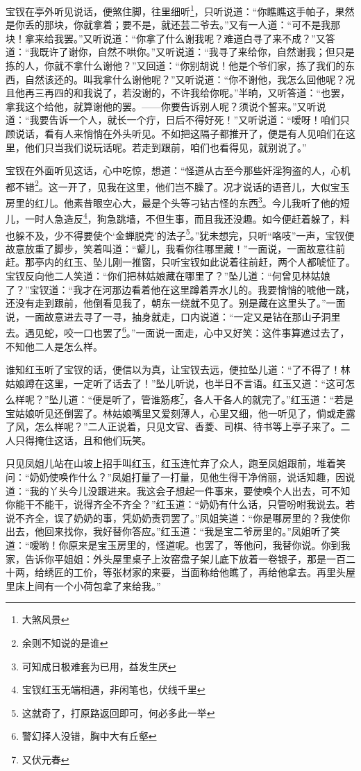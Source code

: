 \documentclass[12pt,oneside]{book}
\begin{document}
宝钗在亭外听见说话，便煞住脚，往里细听\footnote{大煞风景}，只听说道：“你瞧瞧这手帕子，果然是你丢的那块，你就拿着；要不是，就还芸二爷去。”又有一人道：“可不是我那块！拿来给我罢。”又听说道：“你拿了什么谢我呢？难道白寻了来不成？”又答道：“我既许了谢你，自然不哄你。”又听说道：“我寻了来给你，自然谢我；但只是拣的人，你就不拿什么谢他？”又回道：“你别胡说！他是个爷们家，拣了我们的东西，自然该还的。叫我拿什么谢他呢？”又听说道：“你不谢他，我怎么回他呢？况且他再三再四的和我说了，若没谢的，不许我给你呢。”半晌，又听答道：“也罢，拿我这个给他，就算谢他的罢。——你要告诉别人呢？须说个誓来。”又听说道：“我要告诉一个人，就长一个疔，日后不得好死！”又听说道：“嗳呀！咱们只顾说话，看有人来悄悄在外头听见。不如把这隔子都推开了，便是有人见咱们在这里，他们只当我们说玩话呢。若走到跟前，咱们也看得见，就别说了。”

宝钗在外面听见这话，心中吃惊，想道：“怪道从古至今那些奸淫狗盗的人，心机都不错\footnote{余则不知说的是谁}。这一开了，见我在这里，他们岂不臊了。况才说话的语音儿，大似宝玉房里的红儿。他素昔眼空心大，最是个头等刁钻古怪的东西\footnote{可知成日极难套为已用，益发生厌}。今儿我听了他的短儿，一时人急造反\footnote{宝钗红玉无端相遇，非闲笔也，伏线千里}，狗急跳墙，不但生事，而且我还没趣。如今便赶着躲了，料也躲不及，少不得要使个‘金蝉脱壳’的法子\footnote{这就奇了，打原路返回即可，何必多此一举}。”犹未想完，只听“咯吱”一声，宝钗便故意放重了脚步，笑着叫道：“颦儿，我看你往哪里藏！”一面说，一面故意往前赶。那亭内的红玉、坠儿刚一推窗，只听宝钗如此说着往前赶，两个人都唬怔了。宝钗反向他二人笑道：“你们把林姑娘藏在哪里了？”坠儿道：“何曾见林姑娘了？”宝钗道：“我才在河那边看着他在这里蹲着弄水儿的。我要悄悄的唬他一跳，还没有走到跟前，他倒看见我了，朝东一绕就不见了。别是藏在这里头了。”一面说，一面故意进去寻了一寻，抽身就走，口内说道：“一定又是钻在那山子洞里去。遇见蛇，咬一口也罢了\footnote{警幻择人没错，胸中大有丘壑}。”一面说一面走，心中又好笑：这件事算遮过去了，不知他二人是怎么样。

谁知红玉听了宝钗的话，便信以为真，让宝钗去远，便拉坠儿道：“了不得了！林姑娘蹲在这里，一定听了话去了！”坠儿听说，也半日不言语。红玉又道：“这可怎么样呢？”坠儿道：“便是听了，管谁筋疼\footnote{又伏元春}，各人干各人的就完了。”红玉道：“若是宝姑娘听见还倒罢了。林姑娘嘴里又爱刻薄人，心里又细，他一听见了，倘或走露了风，怎么样呢？”二人正说着，只见文官、香菱、司棋、待书等上亭子来了。二人只得掩住这话，且和他们玩笑。

只见凤姐儿站在山坡上招手叫红玉，红玉连忙弃了众人，跑至凤姐跟前，堆着笑问：“奶奶使唤作什么？”凤姐打量了一打量，见他生得干净俏丽，说话知趣，因说道：“我的丫头今儿没跟进来。我这会子想起一件事来，要使唤个人出去，可不知你能干不能干，说得齐全不齐全？”红玉道：“奶奶有什么话，只管吩咐我说去。若说不齐全，误了奶奶的事，凭奶奶责罚罢了。”凤姐笑道：“你是哪房里的？我使你出去，他回来找你，我好替你答应。”红玉道：“我是宝二爷房里的。”凤姐听了笑道：“嗳哟！你原来是宝玉房里的，怪道呢。也罢了，等他问，我替你说。你到我家，告诉你平姐姐：外头屋里桌子上汝窑盘子架儿底下放着一卷银子，那是一百二十两，给绣匠的工价，等张材家的来要，当面称给他瞧了，再给他拿去。再里头屋里床上间有一个小荷包拿了来给我。”
\end{document}
